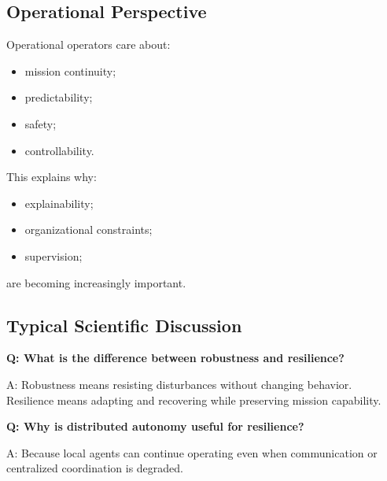 \documentclass[10pt,a4paper,twocolumn]{article}
\begin{document}

\subsection{Operational Perspective}

Operational operators care about:
\begin{itemize}
    \item mission continuity;
    \item predictability;
    \item safety;
    \item controllability.
\end{itemize}

This explains why:
\begin{itemize}
    \item explainability;
    \item organizational constraints;
    \item supervision;
\end{itemize}

are becoming increasingly important.


\subsection{Typical Scientific Discussion}

\begin{questionbox}
    \textbf{Q: What is the difference between robustness and resilience?}

    A: Robustness means resisting disturbances without changing behavior. Resilience means adapting and recovering while preserving mission capability.
\end{questionbox}

\begin{questionbox}
    \textbf{Q: Why is distributed autonomy useful for resilience?}

    A: Because local agents can continue operating even when communication or centralized coordination is degraded.
\end{questionbox}

\end{document}
